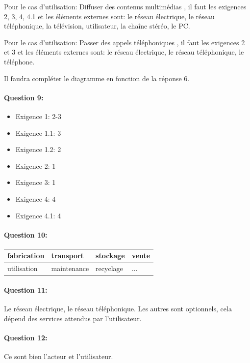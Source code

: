 Pour le cas d'utilisation: \og Diffuser des contenus multimédias \fg, il faut les exigences 2, 3, 4, 4.1 et les éléments externes sont: le réseau électrique, le réseau téléphonique, la télévision, utilisateur, la chaîne stéréo, le PC.

Pour le cas d'utilisation: \og Passer des appels téléphoniques \fg, il faut les exigences 2 et 3 et les éléments externes sont: le réseau électrique, le réseau téléphonique, le téléphone.

Il faudra compléter le diagramme en fonction de la réponse 6.

\paragraph{Question 9:} 
\begin{itemize}
 \item Exigence 1: 2-3
 \item Exigence 1.1: 3 
 \item Exigence 1.2: 2
 \item Exigence 2: 1
 \item Exigence 3: 1
 \item Exigence 4: 4
 \item Exigence 4.1: 4 
\end{itemize}


\paragraph{Question 10:}

\begin{center}
 \begin{tabular}{|l|l|l|l|}
 \hline
 fabrication & transport & stockage & vente \\
 \hline
 utilisation & maintenance & recyclage & ... \\
 \hline
 \end{tabular}
\end{center}

\paragraph{Question 11:} Le réseau électrique, le réseau téléphonique. Les autres sont optionnels, cela dépend des services attendus par l’utilisateur.

\paragraph{Question 12:} Ce sont bien l'acteur et l’utilisateur.

